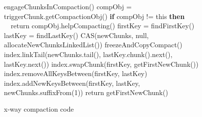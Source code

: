 \begin{figure}
	\begin{center}
		\begin{algorithmic}[1]{}
		\State engageChunksInCompaction() 
		\Statex {}  
		\State compObj = triggerChunk.getCompactionObj()
		\State \textbf{if} compObj != this \textbf{then}
		\State \ \ return compObj.helpCompacting()
		\State firstKey = findFirstKey() 
		\State lastKey = findLastKey() 
		\State CAS(newChunks, null, allocateNewChunksLinkedList()) 
		\State freezeAndCopyCompact() 
		\Statex {}
		\State index.linkTail(newChunks.tail(), lastKey.chunk().next(), lastKey.next())  %
		\Statex {}
		\State index.swapChunk(firstKey, getFirstNewChunk()) %
		\Statex {}
		\State index.removeAllKeysBetween(firstKey, lastKey) 
		\State index.addNewKeysBetween(firstKey, lastKey, newChunks.suffixFrom(1)) 
		\State return getFirstNewChunk()
		\EndFunction
		\end{algorithmic}
		\caption{x-way compaction code} \label{figure:compaction}
	\end{center}
\end{figure}

